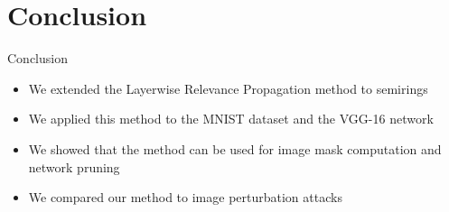 \documentclass[aspectratio=169]{beamer}
\theoremstyle{definition}
\begin{document}
\section*{Conclusion}
\begin{frame}{Conclusion}
    \begin{itemize}[label=\textbullet]
        \item We extended the Layerwise Relevance Propagation method to semirings
        \item We applied this method to the MNIST dataset and the VGG-16 network
        \item We showed that the method can be used for image mask computation and network pruning
        \item We compared our method to image perturbation attacks
    \end{itemize}
\end{frame}


\begin{frame}[allowframebreaks]
    \nocite{*}
    \printbibliography
\end{frame}
\end{document}

